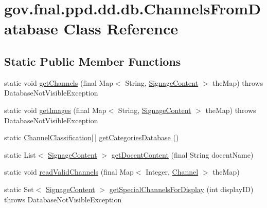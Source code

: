 \hypertarget{classgov_1_1fnal_1_1ppd_1_1dd_1_1db_1_1ChannelsFromDatabase}{\section{gov.\-fnal.\-ppd.\-dd.\-db.\-Channels\-From\-Database Class Reference}
\label{classgov_1_1fnal_1_1ppd_1_1dd_1_1db_1_1ChannelsFromDatabase}
}
\subsection*{Static Public Member Functions}
\begin{DoxyCompactItemize}
\item 
static void \hyperlink{classgov_1_1fnal_1_1ppd_1_1dd_1_1db_1_1ChannelsFromDatabase_a4f56bc3df86bc166d052a5e1df5be71a}{get\-Channels} (final Map$<$ String, \hyperlink{interfacegov_1_1fnal_1_1ppd_1_1dd_1_1signage_1_1SignageContent}{Signage\-Content} $>$ the\-Map)  throws Database\-Not\-Visible\-Exception 
\item 
static void \hyperlink{classgov_1_1fnal_1_1ppd_1_1dd_1_1db_1_1ChannelsFromDatabase_aaff901450a95798cbb5ed035d2ab3af6}{get\-Images} (final Map$<$ String, \hyperlink{interfacegov_1_1fnal_1_1ppd_1_1dd_1_1signage_1_1SignageContent}{Signage\-Content} $>$ the\-Map)  throws Database\-Not\-Visible\-Exception 
\item 
static \hyperlink{classgov_1_1fnal_1_1ppd_1_1dd_1_1changer_1_1ChannelClassification}{Channel\-Classification}\mbox{[}$\,$\mbox{]} \hyperlink{classgov_1_1fnal_1_1ppd_1_1dd_1_1db_1_1ChannelsFromDatabase_a378b7b3be0eb4f7194b4df3adad1ba82}{get\-Categories\-Database} ()
\item 
static List$<$ \hyperlink{interfacegov_1_1fnal_1_1ppd_1_1dd_1_1signage_1_1SignageContent}{Signage\-Content} $>$ \hyperlink{classgov_1_1fnal_1_1ppd_1_1dd_1_1db_1_1ChannelsFromDatabase_a7a75e0d979b68647f696f9a0ac717d64}{get\-Docent\-Content} (final String docent\-Name)
\item 
static void \hyperlink{classgov_1_1fnal_1_1ppd_1_1dd_1_1db_1_1ChannelsFromDatabase_af16576924537b6cb3ea6f742b3d5cbfb}{read\-Valid\-Channels} (final Map$<$ Integer, \hyperlink{interfacegov_1_1fnal_1_1ppd_1_1dd_1_1signage_1_1Channel}{Channel} $>$ the\-Map)
\item 
static Set$<$ \hyperlink{interfacegov_1_1fnal_1_1ppd_1_1dd_1_1signage_1_1SignageContent}{Signage\-Content} $>$ \hyperlink{classgov_1_1fnal_1_1ppd_1_1dd_1_1db_1_1ChannelsFromDatabase_a1829d1fc9e948a3b0c3d0cf57d669b38}{get\-Special\-Channels\-For\-Display} (int display\-I\-D)  throws Database\-Not\-Visible\-Exception 
\end{DoxyCompactItemize}


